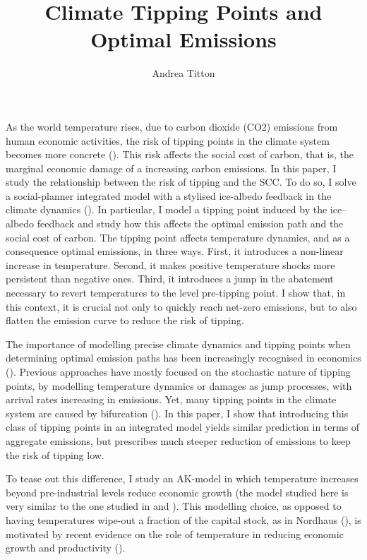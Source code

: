 \documentclass[american, abstract=off]{scrartcl}
\author{Andrea Titton}
\title{Climate Tipping Points and\\ Optimal Emissions}
\begin{document}
\maketitle

As the world temperature rises, due to carbon dioxide (CO2) emissions from human economic activities, the risk of tipping points in the climate system becomes more concrete (\cite{ashwin_extreme_2020,sledd_cloudier_2021}). This risk affects the social cost of carbon, that is, the marginal economic damage of a increasing carbon emissions. In this paper, I study the relationship between the risk of tipping and the SCC. To do so, I solve a social-planner integrated model with a stylised ice-albedo feedback in the climate dynamics (\cite{hogg_glacial_2008,ashwin_tipping_2012}). In particular, I model a tipping point induced by the ice–albedo feedback and study how this affects the optimal emission path and the social cost of carbon. The tipping point affects temperature dynamics, and as a consequence optimal emissions, in three ways. First, it introduces a non-linear increase in temperature. Second, it makes positive temperature shocks more persistent than negative ones. Third, it introduces a jump in the abatement necessary to revert temperatures to the level pre-tipping point. I show that, in this context, it is crucial not only to quickly reach net-zero emissions, but to also flatten the emission curve to reduce the risk of tipping.

The importance of modelling precise climate dynamics and tipping points when determining optimal emission paths has been increasingly recognised in economics (\cite{van_den_bremer_risk-adjusted_2021,dietz_economic_2021,dietz_are_2020,taconet_social_2021,lontzek_stochastic_2015}). Previous approaches have mostly focused on the stochastic nature of tipping points, by modelling temperature dynamics or damages as jump processes, with arrival rates increasing in emissions. Yet, many tipping points in the climate system are caused by bifurcation (\cite{ashwin_extreme_2020,ashwin_tipping_2012}). In this paper, I show that introducing this class of tipping points in an integrated model yields similar prediction in terms of aggregate emissions, but prescribes much steeper reduction of emissions to keep the risk of tipping low.

To tease out this difference, I study an AK-model in which temperature increases beyond pre-industrial levels reduce economic growth (the model studied here is very similar to the one studied in \cite{pindyck_economic_2013} and \cite{hambel_optimal_2021}). This modelling choice, as opposed to having temperatures wipe-out a fraction of the capital stock, as in Nordhaus (\citeyear{nordhaus_estimates_2014,nordhaus_question_2008,nordhaus_revisiting_2017}), is motivated by recent evidence on the role of temperature in reducing economic growth and productivity (\cite{burke_global_2015}).
\end{document}
